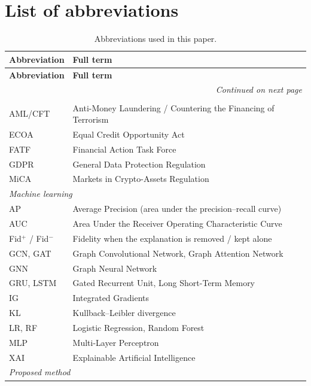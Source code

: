 \section*{List of abbreviations}

\begin{center}
\begin{longtable}{lp{}}
\caption{Abbreviations used in this paper.}
\label{tab:abbreviations} \\
\hline
\textbf{Abbreviation} & \textbf{Full term} \\
\hline
\endfirsthead
\hline
\textbf{Abbreviation} & \textbf{Full term} \\
\hline
\endhead
\hline
\multicolumn{2}{r}{\textit{Continued on next page}} \\
\endfoot
\hline
\endlastfoot
\multicolumn{2}{l}{\textit{Regulatory and legal}} \\
AML/CFT   & Anti-Money Laundering / Countering the Financing of Terrorism \\
ECOA      & Equal Credit Opportunity Act \\
FATF      & Financial Action Task Force \\
GDPR      & General Data Protection Regulation \\
MiCA      & Markets in Crypto-Assets Regulation \\
\hline
\multicolumn{2}{l}{\textit{Machine learning}} \\
AP        & Average Precision (area under the precision--recall curve) \\
AUC       & Area Under the Receiver Operating Characteristic Curve \\
Fid$^{+}$ / Fid$^{-}$ & Fidelity when the explanation is removed / kept alone \\
GCN, GAT  & Graph Convolutional Network, Graph Attention Network \\
GNN       & Graph Neural Network \\
GRU, LSTM & Gated Recurrent Unit, Long Short-Term Memory \\
IG        & Integrated Gradients \\
KL        & Kullback--Leibler divergence \\
LR, RF    & Logistic Regression, Random Forest \\
MLP       & Multi-Layer Perceptron \\
XAI       & Explainable Artificial Intelligence \\
\hline
\multicolumn{2}{l}{\textit{Proposed method}} \\

\end{longtable}
\end{center}
